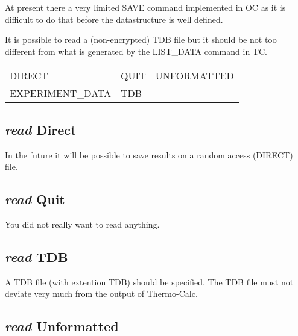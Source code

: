 \documentclass[12pt]{article}
\begin{document}
At present there a very limited SAVE command implemented in OC as it
is difficult to do that before the datastructure is well defined.

It is possible to read a (non-encrypted) TDB file but it should be not
too different from what is generated by the LIST\_DATA command in TC.

\begin{tabular}{lll}
 DIRECT          & QUIT    &         UNFORMATTED\\
 EXPERIMENT\_DATA & TDB\\
\end{tabular}

\subsection{{\em read} Direct}

In the future it will be possible to save results on a random access
(DIRECT) file.

\subsection{{\em read} Quit}

You did not really want to read anything.

\subsection{{\em read} TDB}

A TDB file (with extention TDB) should be specified.  The TDB file
must not deviate very much from the output of Thermo-Calc.

\subsection{{\em read} Unformatted}
\end{document}
